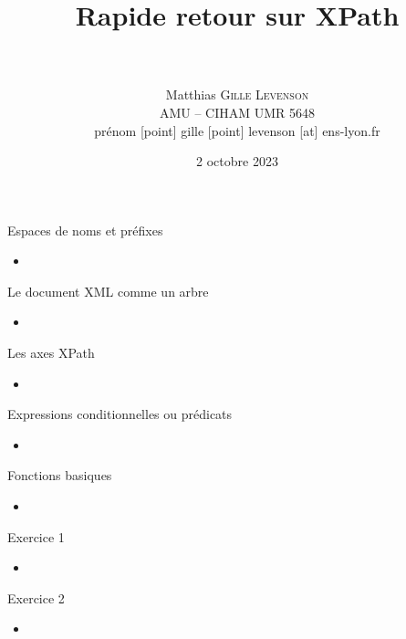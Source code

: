 \documentclass[11pt,aspectratio=169]{beamer}
\date[2 octobre 2023]{2 octobre 2023}
\author[Matthias \textsc{Gille Levenson}]{\\~\\ Matthias \textsc{Gille Levenson}\\   {\scriptsize AMU -- CIHAM UMR 5648}\\ {\tiny prénom [point] gille [point] levenson [at] ens-lyon.fr}\vspace{-1cm}}
\title[Transcription automatisée et HTR]{Rapide retour sur XPath}
\begin{document}
\maketitle



\begin{frame}{Espaces de noms et préfixes}
\begin{itemize}
\item 
\end{itemize}
\end{frame}

\begin{frame}{Le document XML comme un arbre}
\begin{itemize}
\item
\end{itemize}
\end{frame}


\begin{frame}{Les axes XPath}
\begin{itemize}
\item 
\end{itemize}
\end{frame}

\begin{frame}{Expressions conditionnelles ou prédicats}
\begin{itemize}
\item 
\end{itemize}
\end{frame}


\begin{frame}{Fonctions basiques}
\begin{itemize}
\item 
\end{itemize}
\end{frame}



\begin{frame}{Exercice 1}
\begin{itemize}
\item 
\end{itemize}
\end{frame}

\begin{frame}{Exercice 2}
\begin{itemize}
\item 
\end{itemize}
\end{frame}
\end{document}
